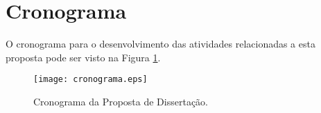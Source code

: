 \section{Cronograma}
\lipsum[11]

O cronograma para o desenvolvimento das atividades relacionadas a esta proposta pode ser visto na Figura \ref{fig:cronograma}.


\begin{figure}[!h]
	\centering
	\texttt{[image: cronograma.eps]}
	\caption{Cronograma da Proposta de Disserta\c{c}\~{a}o.}
	\label{fig:cronograma}
\end{figure}


